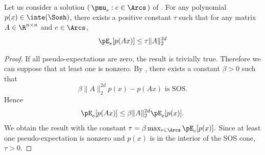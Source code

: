 \begin{lemma}
  \label{lem:thetatoA}
  Let us consider a solution $(\, \pmu_e : e \in \Arcs \,)$ of .
  For any polynomial $p(x) \in \inte(\Sosh)$,
  there exists a positive constant $\tau$
  such that for any matrix $A \in \R^{n \times n}$ and \arc{} $e \in \Arcs$,
  \[ \pE_e[p(A x)] \leq \tau \|A\|_2^{2d} \]
  \begin{proof}
    If all pseudo-expectations are zero, the result is trivially true.
    Therefore we can suppose that at least one is nonzero.
    By , there exists a constant $\beta > 0$ such that
    \[ \beta \|A\|_2^{2d}p(x) - p(Ax) \text{ is SOS}. \]
    Hence
    \[
      \pE_e[p(Ax)] \leq \beta \|A\|_2^{2d} \pE_e[p(x)].
    \]
    We obtain the result with the constant
    \(
    \tau = \beta \max_{e \in \Arcs} \pE_{e}[p(x)].
    \)
    Since at least one pseudo-expectation is nonzero and $p(x)$ is in
    the interior of the SOS cone, $\tau > 0$.
  \end{proof}
\end{lemma}
